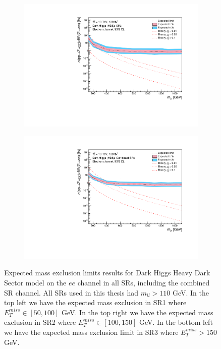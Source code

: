 \documentclass[12pt, a4paper]{book}
\begin{document}
\begin{figure}[!ht]
\begin{subfigure}[b]{0.49\textwidth}
      \includegraphics[width=1\textwidth]{Limits/Model_independent/150/DH_HDS/mass_exclusion_ee.pdf}
   \end{subfigure}
   \hfil
   \begin{subfigure}[b]{0.49\textwidth}
      \centering
      \includegraphics[width=1\textwidth]{Limits/Model_independent/DH_HDS/mass_exclusion_ee.pdf}
   \end{subfigure}
   \caption[Electron channel mass exclusions in DH HDS using the model independent approach]{Expected mass exclusion limits results for Dark Higgs Heavy Dark Sector model on the $ee$ channel in all SRs, including the combined SR channel. All SRs used in this thesis had $m_{ll}>110$ GeV.
   In the top left we have the expected mass exclusion in SR1 where $E_T^{miss} \in [50, 100]$ GeV. In the top right we have the expected mass exclusion in SR2 where $E_T^{miss} \in [100, 150]$ GeV. In the bottom left we have the expected mass exclusion limit in SR3 where $E_T^{miss} >150$ GeV. 
}
\end{figure}
\end{document}
